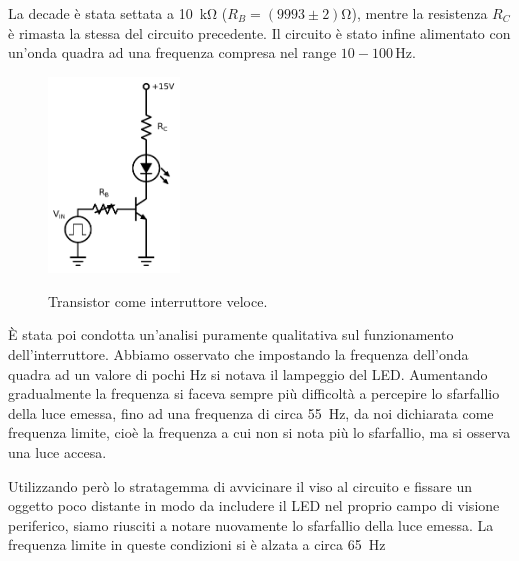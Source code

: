 La decade è stata settata a \SI{10}{\kilo\ohm} ($R_B = (9993 \pm 2)\si{\ohm}$), mentre la resistenza $R_C$ è rimasta la stessa del circuito precedente.
Il circuito è stato infine alimentato con un'onda quadra ad una frequenza compresa nel range $10-100\,\si{\hertz}$. %

\begin{figure}
	\caption{Transistor come interruttore veloce.}
	\includegraphics[width=35mm]{cc2.pdf}
	\label{fig:cc2}
\end{figure}

È stata poi condotta un'analisi puramente qualitativa sul funzionamento dell'interruttore. Abbiamo osservato che impostando la frequenza dell'onda quadra ad un valore di pochi \si{\hertz} si notava il lampeggio del LED. Aumentando gradualmente la frequenza si faceva sempre più difficoltà a percepire lo sfarfallio della luce emessa, fino ad una frequenza di circa \SI{55}{\hertz}, da noi dichiarata come frequenza limite, cioè la frequenza a cui non si nota più lo sfarfallio, ma si osserva una luce accesa.

Utilizzando però lo stratagemma di avvicinare il viso al circuito e fissare un oggetto poco distante in modo da includere il LED nel proprio campo di visione periferico, siamo riusciti a notare nuovamente lo sfarfallio della luce emessa. La frequenza limite in queste condizioni si è alzata a circa \SI{65}{\hertz}
